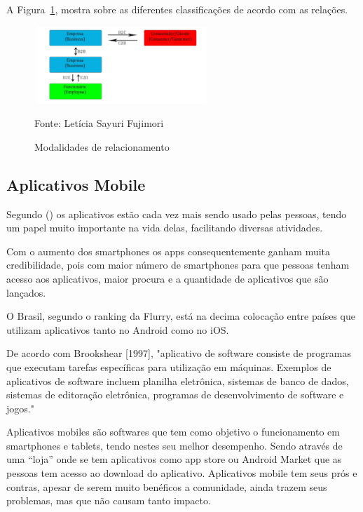 A Figura~\hypersetup{linkcolor=black}\ref{fig:Modalidades}, mostra sobre as diferentes classificações de acordo com as relações.

 \begin{figure}[!h]
	\centering
	\caption{Modalidades de relacionamento}
	\label{fig:Modalidades}
	\includegraphics[width=250px, height=110px]{./images/2-7.jpg}
	\par{Fonte: Letícia Sayuri Fujimori}
\end{figure}

\newpage

\subsection{Aplicativos Mobile}
Segundo (\cite{aplicativos-mobile}) os aplicativos estão cada vez mais sendo usado pelas pessoas, tendo um papel muito importante na vida delas, facilitando diversas atividades.

Com o aumento dos smartphones os apps consequentemente ganham muita credibilidade, pois com maior número de smartphones para que pessoas tenham acesso aos aplicativos, maior procura e a quantidade de aplicativos que são lançados.

O Brasil, segundo o ranking da Flurry, está na decima colocação entre países que utilizam aplicativos tanto no Android como no iOS.

De acordo com Brookshear [1997], "aplicativo de software consiste de programas que executam tarefas específicas para utilização em máquinas. Exemplos de aplicativos de software incluem planilha eletrônica, sistemas de banco de dados, sistemas de editoração eletrônica, programas de desenvolvimento de software e jogos."

Aplicativos mobiles são softwares que tem como objetivo o funcionamento em smartphones e tablets, tendo nestes seu melhor desempenho. Sendo através de uma “loja” onde se tem aplicativos como app store ou Android Market que as pessoas tem acesso ao download do aplicativo.
Aplicativos mobile tem seus prós e contras, apesar de serem muito benéficos a comunidade, ainda trazem seus problemas, mas que não causam tanto impacto.

